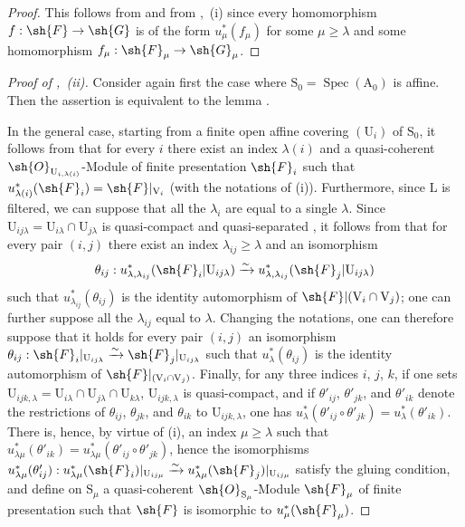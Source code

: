 \begin{proof}
This follows from  and from ,~(i) since every homomorphism $f:\sh{F}\to\sh{G}$ is of the form $u_\mu^*(f_\mu)$ for some $\mu\geqslant\lambda$ and some homomorphism $f_\mu:\sh{F}_\mu\to\sh{G}_\mu$.
\end{proof}

\begin{proof}[Proof of ,~(ii)]
Consider again first the case where $\mathrm{S}_0=\operatorname{Spec}(\mathrm{A}_0)$ is affine.
Then the assertion is equivalent to the lemma .

In the general case, starting from a finite open affine covering $(\mathrm{U}_i)$ of $\mathrm{S}_0$, it follows from  that for every $i$ there exist an index $\lambda(i)$ and a quasi-coherent $\sh{O}_{\mathrm{U}_{i,\lambda(i)}}$-Module of finite presentation $\sh{F}_i$ such that $u_{\lambda(i)}^*(\sh{F}_i)=\sh{F}|_{\mathrm{V}_i}$ (with the notations of (i)).
Furthermore, since $\mathrm{L}$ is filtered, we can suppose that all the $\lambda_i$ are equal to a single $\lambda$.
Since $\mathrm{U}_{ij\lambda}=\mathrm{U}_{i\lambda}\cap\mathrm{U}_{j\lambda}$ is quasi-compact and quasi-separated , it follows from  that for every pair $(i,j)$ there exist an index $\lambda_{ij}\geqslant\lambda$ and an isomorphism
\[
  \theta_{ij}:u_{\lambda,\lambda_{ij}}^*(\sh{F}_i|\mathrm{U}_{ij\lambda})\xrightarrow{\sim}u_{\lambda,\lambda_{ij}}^*(\sh{F}_j|\mathrm{U}_{ij\lambda})
\]
such that $u_{\lambda_{ij}}^*(\theta_{ij})$ is the identity automorphism of $\sh{F}|(\mathrm{V}_i\cap\mathrm{V}_j)$; one can further suppose all the $\lambda_{ij}$ equal to $\lambda$.
Changing the notations, one can therefore suppose that it holds for every pair $(i,j)$ an isomorphism $\theta_{ij}:\sh{F}_i|_{\mathrm{U}_{ij\lambda}}\xrightarrow{\sim}\sh{F}_j|_{\mathrm{U}_{ij\lambda}}$ such that $u_\lambda^*(\theta_{ij})$ is the identity automorphism of $\sh{F}|_{(\mathrm{V}_i\cap\mathrm{V}_j)}$.
Finally, for any three indices $i$, $j$, $k$, if one sets $\mathrm{U}_{ijk,\lambda}=\mathrm{U}_{i\lambda}\cap\mathrm{U}_{j\lambda}\cap\mathrm{U}_{k\lambda}$, $\mathrm{U}_{ijk,\lambda}$ is quasi-compact, and if $\theta'_{ij}$, $\theta'_{jk}$, and $\theta'_{ik}$ denote the restrictions of $\theta_{ij}$, $\theta_{jk}$, and $\theta_{ik}$ to $\mathrm{U}_{ijk,\lambda}$, one has $u_\lambda^*(\theta'_{ij}\circ\theta'_{jk})=u_\lambda^*(\theta'_{ik})$.
There is, hence, by virtue of (i), an index $\mu\geqslant\lambda$ such that $u_{\lambda\mu}^*(\theta'_{ik})=u_{\lambda\mu}^*(\theta'_{ij}\circ\theta'_{jk})$, hence the isomorphisms $u_{\lambda\mu}^*(\theta'_{ij}):u_{\lambda\mu}^*(\sh{F}_i)|_{\mathrm{U}_{ij\mu}}\xrightarrow{\sim}u_{\lambda\mu}^*(\sh{F}_j)|_{\mathrm{U}_{ij\mu}}$ satisfy the gluing condition, and define on $\mathrm{S}_\mu$ a quasi-coherent $\sh{O}_{\mathrm{S}_\mu}$-Module $\sh{F}_\mu$ of finite presentation  such that $\sh{F}$ is isomorphic to $u_\mu^*(\sh{F}_\mu)$.
\end{proof}

